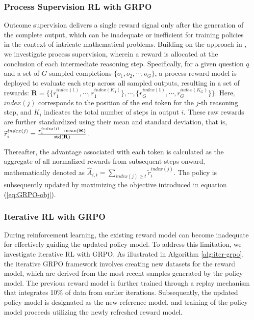 \begin{itemize}[topsep=0pt]
\begin{itemize}[topsep=0pt]
\subsubsection{Process Supervision RL with GRPO}

Outcome supervision delivers a single reward signal only after the generation of the complete output, which can be inadequate or inefficient for training policies in the context of intricate mathematical problems. Building on the approach in \cite{wang2023math}, we investigate process supervision, wherein a reward is allocated at the conclusion of each intermediate reasoning step. Specifically, for a given question $q$ and a set of $G$ sampled completions $\{o_1, o_2, \cdots, o_G\}$, a process reward model is deployed to evaluate each step across all sampled outputs, resulting in a set of rewards: $\mathbf{R} = \{ \{r_1^{index(1)},\cdots,r_1^{index(K_1)}\}, \cdots,  \{r_G^{index(1)},\cdots,r_G^{index(K_G)}\} \}$. Here, $index(j)$ corresponds to the position of the end token for the $j$-th reasoning step, and $K_i$ indicates the total number of steps in output $i$. These raw rewards are further standardized using their mean and standard deviation, that is, $\widetilde{r}_i^{index(j)} = \frac{r_i^{index(j)} - {\rm mean(\mathbf{R})}}{{\rm std(\mathbf{R})}}$. 

Thereafter, the advantage associated with each token is calculated as the aggregate of all normalized rewards from subsequent steps onward, mathematically denoted as $\hat{A}_{i, t} = \sum_{index(j) \ge t} \widetilde{r}_i^{index(j)}$. The policy is subsequently updated by maximizing the objective introduced in equation (\ref{eq:GRPO-obj}).

\subsubsection{Iterative RL with GRPO} During reinforcement learning, the existing reward model can become inadequate for effectively guiding the updated policy model. To address this limitation, we investigate iterative RL with GRPO. As illustrated in Algorithm \ref{alg:iter-grpo}, the iterative GRPO framework involves creating new datasets for the reward model, which are derived from the most recent samples generated by the policy model. The previous reward model is further trained through a replay mechanism that integrates 10\% of data from earlier iterations. Subsequently, the updated policy model is designated as the new reference model, and training of the policy model proceeds utilizing the newly refreshed reward model.


\end{itemize}
\end{itemize}
